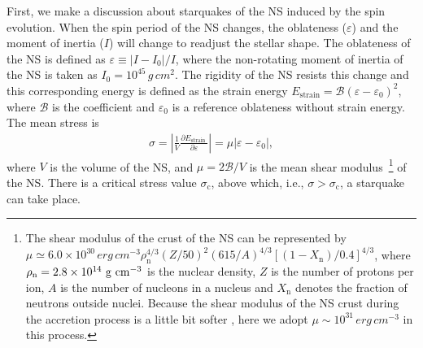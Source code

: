 \documentclass[twocolumn]{aastex62}
\begin{document}
First, we make a discussion about starquakes of the NS induced by the spin evolution.
When the spin period of the NS changes, the oblateness ($\varepsilon$) and the moment of inertia ($I$) will change to readjust the stellar shape. The oblateness of the NS is defined as $\varepsilon \equiv |I - I_0|/I $, where the non-rotating moment of inertia of the NS is taken as $I_0 = 10^{45}\,\unit{g\,cm^{2}}$. The rigidity of the NS resists this change and this corresponding energy is defined as the strain energy
$E_{\text{strain}} = \mathcal{B}\left(\varepsilon-\varepsilon_{0}\right)^{2}$,
where $\mathcal{B}$ is the coefficient and $\varepsilon_{0}$ is a reference oblateness without strain energy.
The mean stress is
\begin{eqnarray}
\sigma=\left|\frac{1}{V} \frac{\partial E_{\text {strain }}}{\partial \varepsilon}\right|=\mu\left|\varepsilon - \varepsilon_{0} \right| ,
\label{sigma}
\end{eqnarray}
where $V$ is the volume of the NS, and $\mu = 2\mathcal{B}/V$ is the mean shear modulus~\footnote{The shear modulus of the crust of the NS can be represented by \citep[e.g.,][]{tom95, dou01, pio05} $ \mu \simeq 6.0 \times 10^{30} \,\unit{ erg\,cm^{-3} }  \rho_{\text{n}}^{4 / 3}(Z/50)^{2}  (615/A)^{4 / 3}[(1-X_{\text{n}})/0.4]^{4 / 3} $, where $\rho_{\text{n}}=2.8\times10^{14}~{\rm g~cm^{-3}}$ is the nuclear density, $Z$ is the number of protons per ion, $A$ is the number of nucleons in a nucleus and $X_{\text{n}}$ denotes the fraction of neutrons outside nuclei.
Because the shear modulus of the NS crust during the accretion process is a little bit softer \citep[e.g.,][]{hae08, zdu08}, here we adopt $\mu \sim 10^{31} \,\unit{ erg\,cm^{-3} }$ in this process.} 
of the NS.
There is a critical stress value $ \sigma_{\text{c}}$, above which, i.e., $\sigma > \sigma_{\text{c}}$, a starquake can take place.
\end{document}
